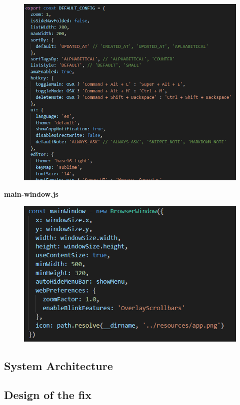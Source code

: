 \documentclass[main.tex]{subfiles}
\begin{document}
\begin{figure}[h]
\includegraphics[scale=0.5]{images/export.png}
\centering
\end{figure}
\clearpage

\textbf{main-window.js}

\begin{figure}[h]
\includegraphics[scale=0.7]{images/mainWindow.png}
\centering
\end{figure}


\subsection{System Architecture}

\subsection{Design of the fix}
\end{document}
